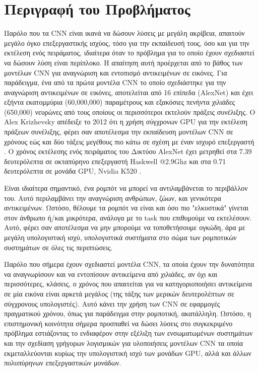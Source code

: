\section{Περιγραφή του Προβλήματος}
\label{section:problem_description}

Παρόλο που τα CΝΝ είναι ικανά να δώσουν λύσεις με μεγάλη ακρίβεια, απαιτούν
μεγάλο όγκο επεξεργαστικής ισχύος, τόσο για την εκπαίδευσή τους, όσο και για την
εκτέλεση ενός πειράματος, ιδιαίτερα όταν το πρόβλημα για το οποίο έχουν
σχεδιαστεί να δώσουν λύση είναι περίπλοκο. Η απαίτηση αυτή προέρχεται από το βάθος %
των μοντέλων CNN για αναγνώριση και εντοπισμό αντικειμένων σε εικόνες.
Για παράδειγμα, ένα από τα πρώτα μοντέλα CNN το οποίο σχεδιάστηκε για την
αναγνώριση αντικειμένων σε εικόνες, αποτελείται από 16 επίπεδα (AlexNet)
και έχει εξήντα εκατομμύρια (60,000,000) παραμέτρους και
εξακόσιες πενήντα χιλιάδες (650,000) νευρώνες από τους οποίους οι περισσότεροι
εκτελούν πράξεις συνέλιξης. Ο Alex Krizhevsky απέδειξε το 2012 ότι η χρήση
σύγχρονων GPU για την εκτέλεση πράξεων συνέλιξης, φέρει σαν αποτέλεσμα την
εκπαίδευση μοντέλων CNN σε χρόνους εώς και δύο τάξεις μεγέθους πιο κάτω σε σχέση
με έναν ισχυρό επεξεργαστή \cite{NIPS2012_4824}. 
Ο χρόνος εκτέλεσης ενός πειράματος του Δικτύου AlexNet
έχει μετρηθεί στα 7.39 δευτερόλεπτα σε οκταπύρηνο επεξεργαστή Haskwell @2.9Ghz
και στα 0.71 δευτερόλεπτα σε μονάδα GPU, Nvidia K520 \cite{abuzaidoptimizing}.

Είναι ιδιαίτερα σημαντικό, ένα ρομπότ να μπορεί να αντιλαμβάνεται το περιβάλλον
του.
Αυτό περιλαμβάνει την αναγνώριση ανθρώπων, ζώων, και γενικότερα αντικειμένων. Ωστόσο,
θέλουμε τα ρομπότ να είναι και όσο πιο "ελκυστικά" γίνεται στον άνθρωπο ή/και μικρότερα,
ανάλογα με το task που επιθυμούμε να εκτελέσουν.
Αυτό, φέρει σαν αποτέλεσμα να μην μπορούμε να τοποθετήσουμε ογκώδη, άρα με μεγάλη
υπολογιστική ισχύ, υπολογιστικά συστήματα στο σώμα των ρομποτικών συστημάτων σε όλες
τις περιπτώσεις.

Παρόλο που σήμερα έχουν σχεδιαστεί μοντέλα CNN, τα οποία έχουν την δυνατότητα να
αναγνωρίσουν και να εντοπίσουν αντικείμενα από χιλιάδες, αν όχι και περισσότερες,
κλάσεις, ο χρόνος που απαιτείται για να κατηγοριοποιήσει αντικείμενα σε μία εικόνα
είναι αρκετά μεγάλος (της τάξης των μερικών δευτερολέπτων σε σύγχρονους υπολογιστές).
Αυτό κάνει την χρήση των CNN σε εφαρμογές πραγματικού χρόνου, όπως για παράδειγμα
στην ρομποτική, ακατάλληλη.
Ωστόσο, η επιστημονική κοινότητα σήμερα προσπαθεί να δώσει λύσεις στο συγκεκριμένο
πρόβλημα εστιάζοντας το ενδιαφέρον στην εξέλιξη των ενσωματωμένων συστημάτων
και την σχεδίαση γρήγορων λογισμικών για υλοποιήσεις μοντέλων CNN τα οποία
εκμεταλλεύονται κυρίως την υπολογιστική ισχύ των μονάδων GPU, αλλά και άλλων
πολυπύρηνων επεξεργαστικών μονάδων.
